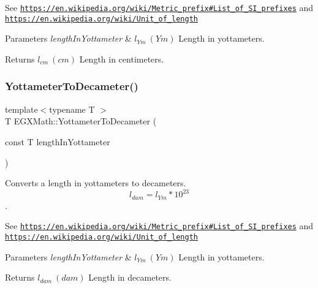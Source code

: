 See \href{https://en.wikipedia.org/wiki/Metric_prefix#List_of_SI_prefixes}{\tt https\+://en.\+wikipedia.\+org/wiki/\+Metric\+\_\+prefix\#\+List\+\_\+of\+\_\+\+S\+I\+\_\+prefixes} and \href{https://en.wikipedia.org/wiki/Unit_of_length}{\tt https\+://en.\+wikipedia.\+org/wiki/\+Unit\+\_\+of\+\_\+length} 
\begin{DoxyParams}{Parameters}
{\em length\+In\+Yottameter} & $ l_{Ym}\ (Ym)$ Length in yottameters. \\
\hline
\end{DoxyParams}
\begin{DoxyReturn}{Returns}
$ l_{cm}\ (cm)$ Length in centimeters. 
\end{DoxyReturn}
\mbox{\label{group___e_g_x_math-_conversions-_length_conversions-_s_i-_yottameter-_s_i_gadb4ab7fb7c1091124160d66ace6439a3}} 
\subsubsection{\texorpdfstring{Yottameter\+To\+Decameter()}{YottameterToDecameter()}}
{\footnotesize\ttfamily template$<$typename T $>$ \\
T E\+G\+X\+Math\+::\+Yottameter\+To\+Decameter (\begin{DoxyParamCaption}\item[{const T}]{length\+In\+Yottameter }\end{DoxyParamCaption})}



Converts a length in yottameters to decameters. \[ l_{dam}=l_{Ym} * 10^{23} \]. 

See \href{https://en.wikipedia.org/wiki/Metric_prefix#List_of_SI_prefixes}{\tt https\+://en.\+wikipedia.\+org/wiki/\+Metric\+\_\+prefix\#\+List\+\_\+of\+\_\+\+S\+I\+\_\+prefixes} and \href{https://en.wikipedia.org/wiki/Unit_of_length}{\tt https\+://en.\+wikipedia.\+org/wiki/\+Unit\+\_\+of\+\_\+length} 
\begin{DoxyParams}{Parameters}
{\em length\+In\+Yottameter} & $ l_{Ym}\ (Ym)$ Length in yottameters. \\
\hline
\end{DoxyParams}
\begin{DoxyReturn}{Returns}
$ l_{dam}\ (dam)$ Length in decameters. 
\end{DoxyReturn}
\mbox{\label{group___e_g_x_math-_conversions-_length_conversions-_s_i-_yottameter-_s_i_ga8d80b66500f1ccc85839ec50b0ca8b0d}} 
